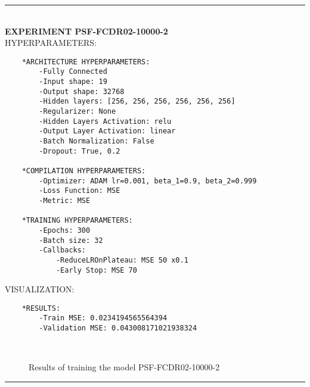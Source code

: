 \rule{0.5\textwidth}{0.5pt}\\

	{\large \textbf{EXPERIMENT PSF-FCDR02-10000-2}}\\
	
	{\normalsize HYPERPARAMETERS:}
	\begin{lstlisting}	
	*ARCHITECTURE HYPERPARAMETERS:
		-Fully Connected
		-Input shape: 19
		-Output shape: 32768
		-Hidden layers: [256, 256, 256, 256, 256, 256]
		-Regularizer: None
		-Hidden Layers Activation: relu
		-Output Layer Activation: linear
		-Batch Normalization: False
		-Dropout: True, 0.2
	
	*COMPILATION HYPERPARAMETERS:
		-Optimizer: ADAM lr=0.001, beta_1=0.9, beta_2=0.999
		-Loss Function: MSE
		-Metric: MSE
	
	*TRAINING HYPERPARAMETERS:
		-Epochs: 300
		-Batch size: 32
		-Callbacks: 
			-ReduceLROnPlateau: MSE 50 x0.1
			-Early Stop: MSE 70
	\end{lstlisting}
	
	{\normalsize VISUALIZATION:}
	\begin{lstlisting}
	*RESULTS:
        -Train MSE: 0.0234194565564394
        -Validation MSE: 0.043008171021938324
	\end{lstlisting}
	
	\begin{figure*}[ht!]
		\hspace{\fill}
		\hspace{\fill}
		\\
		\caption{Results of training the model PSF-FCDR02-10000-2}
	\end{figure*}
	
\FloatBarrier	
\rule{0.5\textwidth}{0.5pt}\\